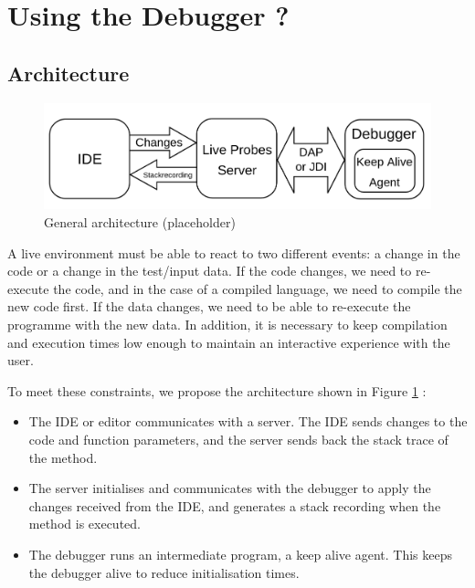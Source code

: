 \documentclass[english,submission]{programming}
\begin{document}
\section{Using the Debugger ?}

\subsection{Architecture}

\begin{figure}[h]
  \centering
  \includegraphics[width=0.8\linewidth]{img/architecture.png}
  \caption{General architecture (placeholder)}
  \label{fig:architecture}
\end{figure}

A live environment must be able to react to two different events: a change in the code or a change in the test/input data. 
If the code changes, we need to re-execute the code, and in the case of a compiled language, we need to compile the new code first. 
If the data changes, we need to be able to re-execute the programme with the new data. 
In addition, it is necessary to keep compilation and execution times low enough to maintain an interactive experience with the user.

To meet these constraints, we propose the architecture shown in Figure \ref{fig:architecture} :
\begin{itemize}
  \item The IDE or editor communicates with a server. The IDE sends changes to the code and function parameters, and the server sends back the stack trace of the method.
  \item The server initialises and communicates with the debugger to apply the changes received from the IDE, and generates a stack recording when the method is executed.
  \item The debugger runs an intermediate program, a keep alive agent. This keeps the debugger alive to reduce initialisation times.
\end{itemize}
\end{document}
